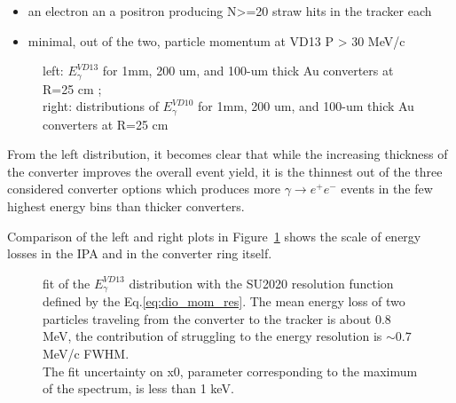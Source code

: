 \begin{itemize}
\item
  an electron an a positron producing N>=20 straw hits in the tracker each
\item
  minimal, out of the two, particle momentum at VD13 P > 30 MeV/c
\end{itemize}

\begin{figure}[H]
  \caption{
    \label{figure:sum_mom_vd13}
    left: $E_\gamma^{VD13}$ for 1mm, 200 um, and 100-um thick Au converters at R=25 cm ; \\
    right: distributions of $E_\gamma^{VD10}$ for 1mm, 200 um, and 100-um thick Au converters at R=25 cm
  }
\end{figure}

From the left distribution, it becomes clear that while the increasing thickness of the converter improves the
overall event yield, it is the thinnest out of the three considered converter options which produces
more $\gamma \to e^+e^-$ events in the few highest energy bins than thicker converters.

Comparison of the left and right plots in Figure~\ref{figure:sum_mom_vd13} shows the scale of energy
losses in the IPA and in the converter ring itself.

\begin{figure}[H]
  \caption{
    \label{figure:00083}
    fit of the $E_\gamma^{VD13}$ distribution with the SU2020 resolution function defined by
    the Eq.\ref{eq:dio_mom_res}.
    The mean energy loss of two particles traveling from the converter to the tracker is about 0.8 MeV,
    the contribution of struggling to the energy resolution is $\sim 0.7$ MeV/c FWHM. \\
    The fit uncertainty on x0, parameter corresponding to the maximum of the spectrum,
    is less than 1 keV.
  }
\end{figure}

